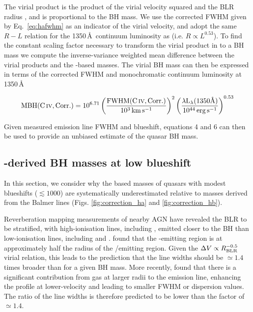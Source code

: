 The virial product is the product of the virial velocity squared and the BLR radius \citep[e.g.][]{shen13}, and is proportional to the BH mass. 
We use the corrected  FWHM given by Eq.~\ref{eq:hafwhm} as an indicator of the virial velocity, and adopt the same $R-L$ relation for the 1350\,\AA\, continuum luminosity as \citet{vestergaard06} (i.e. $R \propto L^{0.53}$). 
To find the constant scaling factor necessary to transform the virial product in to a BH mass we compute the inverse-variance weighted mean difference between the virial products and the \hans-based masses. 
The virial BH mass can then be expressed in terms of the corrected  FWHM and monochromatic continuum luminosity at 1350\,\AA

\begin{equation}
  \label{eq:masscorrection}
  \mathrm{MBH}(\mathrm{C}\,\textsc{iv}, \mathrm{Corr.}) = 10^{6.71}\left( \frac{ \mathrm{FWHM}(\mathrm{C}\,\textsc{iv}, \mathrm{Corr.})}{10^3 \rm{\,km\,s^{-1}}} \right)^2 \left( \frac{\lambda \mathrm{L}_{\lambda} (1350 \text{\AA}) }{10^{44} \rm{\,erg\,s^{-1}}}  \right)^{0.53}
\end{equation}

Given measured  emission line FWHM and blueshift, equations 4 and 6 can then be used to provide an unbiased estimate of the quasar BH mass.

\subsection{-derived BH masses at low  blueshift}

In this section, we consider why the  based masses of quasars with modest  blueshifts ($\lesssim1000$\kms) are systematically underestimated relative to masses derived from the Balmer lines (Figs. \ref{fig:correction_ha} and \ref{fig:correction_hb}). 

Reverberation mapping measurements of nearby AGN have revealed the BLR to be stratified, with high-ionisation lines, including , emitted closer to the BH than low-ionisation lines, including \ha and \hb \citep[e.g.][]{onken02}.
\citet{vestergaard06} found that the -emitting region is at approximately half the radius of the \hbns/\ha emitting region.
Given the $\Delta V \propto R_{\rm BLR}^{-0.5}$ virial relation, this leads to the prediction that the  line widths should be $\simeq 1.4$ times broader than \ha for a given BH mass. 
More recently, \citet{denney12} found that there is a significant contribution from gas at larger radii to the  emission line, enhancing the profile at lower-velocity and leading to smaller FWHM or dispersion values. 
The ratio of the line widths is therefore predicted to be lower than the factor of $\simeq 1.4$. 

